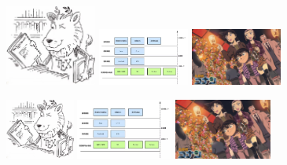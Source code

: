 \documentclass{ctexart}
\begin{document}
    \includegraphics[width=3cm]{lion.jpg}
    \includegraphics[width=3cm]{cs.jpg}
    \includegraphics[width=3cm]{conan.jpg}

    \includegraphics[height=2cm]{lion.jpg}
    \includegraphics[height=2cm]{cs.jpg}
    \includegraphics[height=2cm]{conan.jpg}
\end{document}
